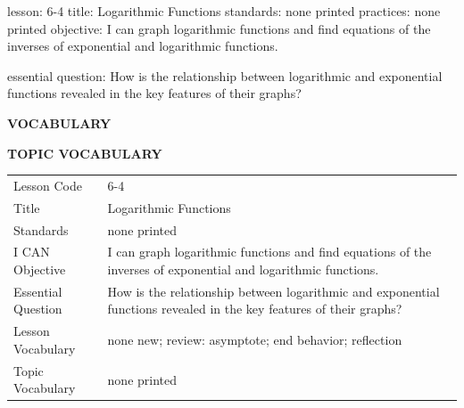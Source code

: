 \documentclass{article}
\newenvironment{lesson-meta}{}{}        %
\newcommand{\te}[1]{}                   %
\begin{document}
\begin{lesson-meta}
lesson: 6-4
title: Logarithmic Functions
standards: none printed
practices: none printed
objective: I can graph logarithmic functions and find equations of the inverses of exponential and logarithmic functions.

essential question: How is the relationship between logarithmic and exponential functions revealed in the key features of their graphs?

\textbf{VOCABULARY}
\te{No new vocabulary is listed. Review vocabulary: asymptote; end behavior; reflection.}
\textbf{TOPIC VOCABULARY}
\te{No separate topic vocabulary list is printed on these lesson pages.}
\begin{tabular}{ll}
Lesson Code & 6-4 \\
Title & Logarithmic Functions \\
Standards & none printed \\
I CAN Objective & I can graph logarithmic functions and find equations of the inverses of exponential and logarithmic functions. \\
Essential Question & How is the relationship between logarithmic and exponential functions revealed in the key features of their graphs? \\
Lesson Vocabulary & none new; review: asymptote; end behavior; reflection \\
Topic Vocabulary & none printed \\
\end{tabular}
\end{lesson-meta}
\end{document}
